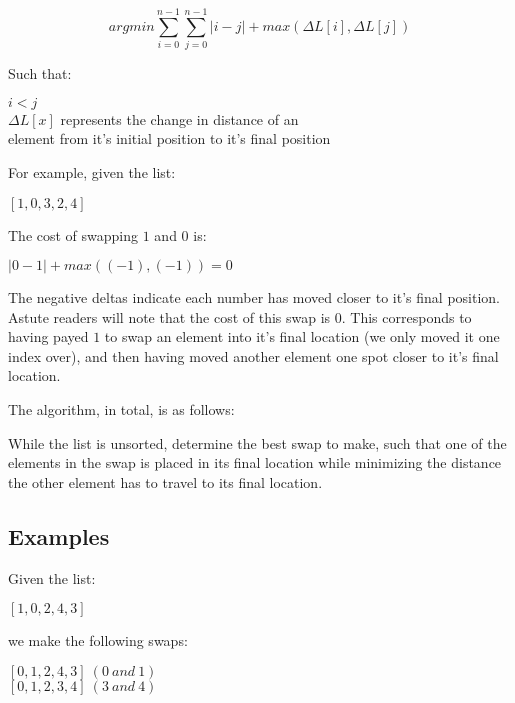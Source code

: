 \documentclass[11pt, oneside]{article}   	%
\begin{document}
\begin{center}
$$argmin\sum_{i=0}^{n-1}\sum_{j=0}^{n-1}|i - j| + max(\Delta L[i], \Delta L[j])$$
\end{center}

Such that:

\begin{center}
$i < j$\\
$\Delta L[x]$ represents the change in distance of an \\element from it's initial position to it's final position
\end{center}

For example, given the list:

\begin{center}$[1, 0, 3, 2, 4]$\end{center}

The cost of swapping $1$ and $0$ is:

\begin{center}
$|0 - 1| + max((-1),(-1)) = 0$
\end{center}

The negative deltas indicate each number has moved closer to it's final position. Astute readers will note that the cost of this swap is 0. This corresponds to having payed $1$ to swap an element into it's final location (we only moved it one index over), and then having moved another element one spot closer to it's final location. 

The algorithm, in total, is as follows:

While the list is unsorted, determine the best swap to make, such that one of the elements in the swap is placed in its final location while minimizing the distance the other element has to travel to its final location. 

\subsection{Examples}

Given the list:

\begin{center}$[1, 0, 2, 4, 3]$\end{center}

we make the following swaps:

\begin{center}
$[0, 1, 2, 4, 3]\ (0\ and\ 1)$\\
$[0, 1, 2, 3, 4]\ (3\ and\ 4)$
\end{center}
\end{document}
